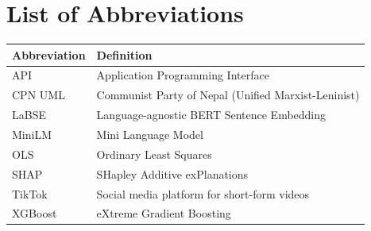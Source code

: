 \documentclass[12pt,a4paper]{report}
\begin{document}
\begin{abstract}
Taken together, the findings support a framework in which political virality on TikTok is shaped primarily by sender capacity, secondarily by actor-linked content signaling, and only indirectly by platform affordances observed through metadata. The study contributes an open-source multimodal analysis pipeline, an explicit discussion of operationalization tradeoffs, and a clearer framework for studying political virality on short-video platforms without overstating causal claims. In plain terms, the policy lesson is simple: social media can widen access to political information and help newer actors gain attention, but election governance on short-video platforms should focus not only on harmful content, but also on who gets seen, how that visibility can be checked, and whether public institutions in Nepal can independently audit political reach.
\end{abstract}

\clearpage
\tableofcontents

\clearpage
\listoftables

\clearpage
\section*{List of Abbreviations}
\begin{tabular}{ll}
\textbf{Abbreviation} & \textbf{Definition} \\
\hline
API & Application Programming Interface \\
CPN UML & Communist Party of Nepal (Unified Marxist-Leninist) \\
LaBSE & Language-agnostic BERT Sentence Embedding \\
MiniLM & Mini Language Model \\
OLS & Ordinary Least Squares \\
SHAP & SHapley Additive exPlanations \\
TikTok & Social media platform for short-form videos \\
XGBoost & eXtreme Gradient Boosting \\
\end{tabular}

\clearpage
{}
\end{document}
